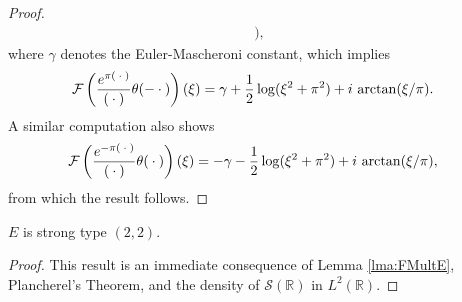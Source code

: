 \documentclass[../dissertation.tex]{subfiles}
\begin{document}
\begin{proof}
\begin{align*}
				\big),
				\nonumber
	\end{align*}
	where $\gamma$ denotes the Euler-Mascheroni constant, which implies
	\begin{align}
		\mathcal F \left( 
			 \frac{e^{\pi (\kern 0.5ex \cdot \kern 0.5ex)}}{(\kern 0.5ex \cdot \kern 0.5ex)} \theta(-\kern 0.5ex \cdot \kern 0.5ex)
		\right)(\xi)
			&=
				\gamma
				+ \frac{1}{2} \log(\xi^2 + \pi^2) 
				+ i \, \arctan(\xi/\pi).
	\end{align}
	A similar computation also shows 
	\begin{align}
		\mathcal F \left( 
			 \frac{e^{-\pi (\kern 0.5ex \cdot \kern 0.5ex)}}{(\kern 0.5ex \cdot \kern 0.5ex)} \theta(\kern 0.5ex \cdot \kern 0.5ex)
		\right)(\xi)
			&= 
				- \gamma
				- \frac{1}{2} \log(\xi^2 + \pi^2) 
				+ i \, \arctan(\xi/\pi),
	\end{align}
	from which the result follows.
\end{proof}

\begin{thm}\label{thm:Estrong}
	$E$ is strong type $(2, 2)$.
\end{thm}
\begin{proof}
	This result is an immediate consequence of Lemma \ref{lma:FMultE}, 
	Plancherel's Theorem, and the density of $\mathscr S(\mathbb R)$ 
	in $L^2(\mathbb R)$.
\end{proof}
\end{document}
